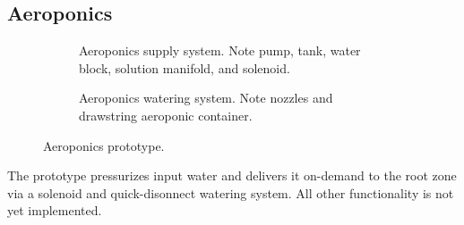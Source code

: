 \subsection{Aeroponics}

\begin{figure}[h!]
  \centering
  \begin{subfigure}{.45\textwidth}
      \centering
      \caption{Aeroponics supply system. Note pump, tank, water block, solution manifold, and solenoid.}
      \label{fig:prototype_aeroponics_supply}
    \end{subfigure}
    \hspace{.05\textwidth}
    \begin{subfigure}{.45\textwidth}
      \centering
      \caption{Aeroponics watering system. Note nozzles and drawstring aeroponic container.}
      \label{fig:prototype_aeroponics_watering}
    \end{subfigure}
    \caption{Aeroponics prototype.}
\end{figure}

The prototype pressurizes input water and delivers it on-demand to the root zone via a solenoid and  quick-disonnect watering system. All other functionality is not yet implemented. 